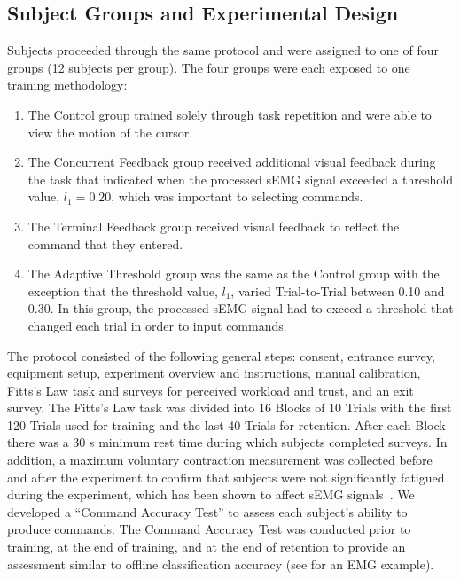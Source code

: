 \begin{mdframed}[hidealllines=true,backgroundcolor=blue!20]
	\subsection{Subject Groups and Experimental Design}
	Subjects proceeded through the same protocol and were assigned to one of four groups (12 subjects per group).
	The four groups were each exposed to one training methodology:

	\begin{enumerate}
		\item The Control group trained solely through task repetition and were able to view the motion of the cursor.
		\item The Concurrent Feedback group received additional visual feedback during the task that indicated when the processed sEMG signal exceeded a threshold value, $l_1=0.20$, which was important to selecting commands.
		\item The Terminal Feedback group received visual feedback to reflect the command that they entered.
		\item The Adaptive Threshold group was the same as the Control group with the exception that the threshold value, $l_1$, varied Trial-to-Trial between 0.10 and 0.30.
		      In this group, the processed sEMG signal had to exceed a threshold that changed each trial in order to input commands.
	\end{enumerate}

	The protocol consisted of the following general steps: consent, entrance survey, equipment setup, experiment overview and instructions, manual calibration, Fitts's Law task and surveys for perceived workload and trust, and an exit survey.
	The Fitts's Law task was divided into 16 Blocks of 10 Trials with the first 120 Trials used for training and the last 40 Trials for retention.
	After each Block there was a 30 s minimum rest time during which subjects completed surveys.
	In addition, a maximum voluntary contraction measurement was collected before and after the experiment to confirm that subjects were not significantly fatigued during the experiment, which has been shown to affect sEMG signals~\citep{RN47}.
	We developed a ``Command Accuracy Test'' to assess each subject's ability to produce commands.
	The Command Accuracy Test was conducted prior to training, at the end of training, and at the end of retention to provide an assessment similar to offline classification accuracy (see \citet{RN48} for an EMG example).


\end{mdframed}
